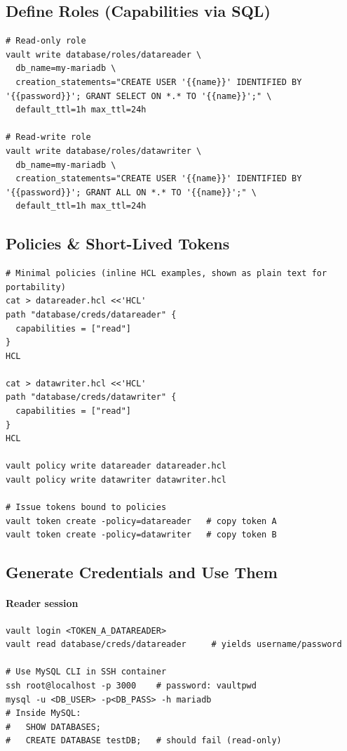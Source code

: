 \documentclass[11pt]{article}
\begin{document}
\subsection*{Define Roles (Capabilities via SQL)}
\begin{verbatim}
# Read-only role
vault write database/roles/datareader \
  db_name=my-mariadb \
  creation_statements="CREATE USER '{{name}}' IDENTIFIED BY '{{password}}'; GRANT SELECT ON *.* TO '{{name}}';" \
  default_ttl=1h max_ttl=24h

# Read-write role
vault write database/roles/datawriter \
  db_name=my-mariadb \
  creation_statements="CREATE USER '{{name}}' IDENTIFIED BY '{{password}}'; GRANT ALL ON *.* TO '{{name}}';" \
  default_ttl=1h max_ttl=24h
\end{verbatim}

\subsection*{Policies \& Short-Lived Tokens}
\begin{verbatim}
# Minimal policies (inline HCL examples, shown as plain text for portability)
cat > datareader.hcl <<'HCL'
path "database/creds/datareader" {
  capabilities = ["read"]
}
HCL

cat > datawriter.hcl <<'HCL'
path "database/creds/datawriter" {
  capabilities = ["read"]
}
HCL

vault policy write datareader datareader.hcl
vault policy write datawriter datawriter.hcl

# Issue tokens bound to policies
vault token create -policy=datareader   # copy token A
vault token create -policy=datawriter   # copy token B
\end{verbatim}

\subsection*{Generate Credentials and Use Them}
\paragraph{Reader session}
\begin{verbatim}
vault login <TOKEN_A_DATAREADER>
vault read database/creds/datareader     # yields username/password

# Use MySQL CLI in SSH container
ssh root@localhost -p 3000    # password: vaultpwd
mysql -u <DB_USER> -p<DB_PASS> -h mariadb
# Inside MySQL:
#   SHOW DATABASES;
#   CREATE DATABASE testDB;   # should fail (read-only)
\end{verbatim}
\clearpage
\end{document}
